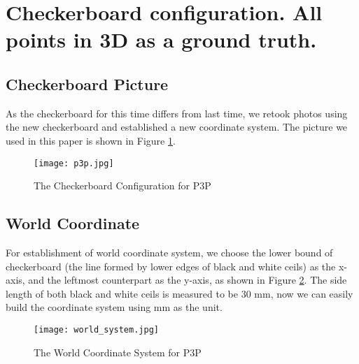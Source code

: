 \documentclass[conference]{IEEEtran}
\begin{document}




\maketitle





%
\IEEEpeerreviewmaketitle


\section{Checkerboard configuration. All points in 3D as a ground truth.}
\subsection{Checkerboard Picture}
As the checkerboard for this time differs from last time, we retook photos using the new checkerboard and established a new coordinate system. The picture we used in this paper is shown in Figure \ref{p3p}.
\begin{figure}
  \centering \texttt{[image: p3p.jpg]}
  \caption{The Checkerboard Configuration for P3P}
  \label{p3p}
\end{figure}

\subsection{World Coordinate}
For establishment of world coordinate system, we choose the lower bound of checkerboard (the line formed by lower edges of black and white ceils) as the x-axis, and the leftmost counterpart as the y-axis, as shown in Figure \ref{world}. The side length of both black and white ceils is measured to be 30 mm, now we can easily build the coordinate system using mm as the unit. 
\begin{figure}
  \centering \texttt{[image: world\_system.jpg]}
  \caption{The World Coordinate System for P3P}
  \label{world}
\end{figure}
\end{document}

